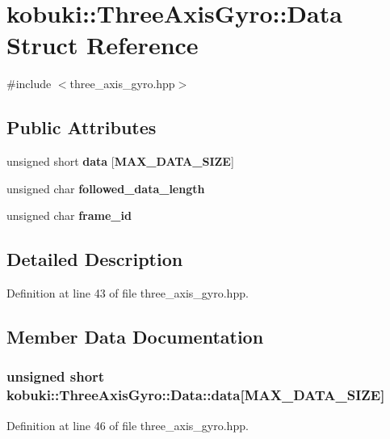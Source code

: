 \section{kobuki\-:\-:\-Three\-Axis\-Gyro\-:\-:\-Data \-Struct \-Reference}
\label{structkobuki_1_1ThreeAxisGyro_1_1Data}


{\ttfamily \#include $<$three\-\_\-axis\-\_\-gyro.\-hpp$>$}

\subsection*{\-Public \-Attributes}
\begin{DoxyCompactItemize}
\item 
unsigned short {\bf data} [{\bf \-M\-A\-X\-\_\-\-D\-A\-T\-A\-\_\-\-S\-I\-Z\-E}]
\item 
unsigned char {\bf followed\-\_\-data\-\_\-length}
\item 
unsigned char {\bf frame\-\_\-id}
\end{DoxyCompactItemize}


\subsection{\-Detailed \-Description}


\-Definition at line 43 of file three\-\_\-axis\-\_\-gyro.\-hpp.



\subsection{\-Member \-Data \-Documentation}
\subsubsection[{data}]{\setlength{\rightskip}{0pt plus 5cm}unsigned short {\bf kobuki\-::\-Three\-Axis\-Gyro\-::\-Data\-::data}[{\bf \-M\-A\-X\-\_\-\-D\-A\-T\-A\-\_\-\-S\-I\-Z\-E}]}\label{structkobuki_1_1ThreeAxisGyro_1_1Data_a8c679a4e0d0b6969b0d5c28574525e30}


\-Definition at line 46 of file three\-\_\-axis\-\_\-gyro.\-hpp.

